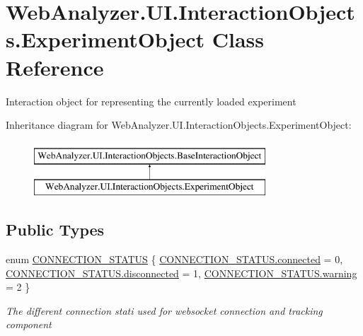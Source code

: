 \hypertarget{class_web_analyzer_1_1_u_i_1_1_interaction_objects_1_1_experiment_object}{}\section{Web\+Analyzer.\+U\+I.\+Interaction\+Objects.\+Experiment\+Object Class Reference}
\label{class_web_analyzer_1_1_u_i_1_1_interaction_objects_1_1_experiment_object}


Interaction object for representing the currently loaded experiment  


Inheritance diagram for Web\+Analyzer.\+U\+I.\+Interaction\+Objects.\+Experiment\+Object\+:\begin{figure}[H]
\begin{center}
\leavevmode
\includegraphics[height=2.000000cm]{class_web_analyzer_1_1_u_i_1_1_interaction_objects_1_1_experiment_object}
\end{center}
\end{figure}
\subsection*{Public Types}
\begin{DoxyCompactItemize}
\item 
enum \hyperlink{class_web_analyzer_1_1_u_i_1_1_interaction_objects_1_1_experiment_object_a2875208b4f4b0ed643593152f4ec025c}{C\+O\+N\+N\+E\+C\+T\+I\+O\+N\+\_\+\+S\+T\+A\+T\+U\+S} \{ \hyperlink{class_web_analyzer_1_1_u_i_1_1_interaction_objects_1_1_experiment_object_a2875208b4f4b0ed643593152f4ec025ca06aa6fa8bdc2078e7e1bd903e70c8f6a}{C\+O\+N\+N\+E\+C\+T\+I\+O\+N\+\_\+\+S\+T\+A\+T\+U\+S.\+connected} = 0, 
\hyperlink{class_web_analyzer_1_1_u_i_1_1_interaction_objects_1_1_experiment_object_a2875208b4f4b0ed643593152f4ec025ca3a561116f0c9675a3c83d21fa365050d}{C\+O\+N\+N\+E\+C\+T\+I\+O\+N\+\_\+\+S\+T\+A\+T\+U\+S.\+disconnected} = 1, 
\hyperlink{class_web_analyzer_1_1_u_i_1_1_interaction_objects_1_1_experiment_object_a2875208b4f4b0ed643593152f4ec025ca7b83d3f08fa392b79e3f553b585971cd}{C\+O\+N\+N\+E\+C\+T\+I\+O\+N\+\_\+\+S\+T\+A\+T\+U\+S.\+warning} = 2
 \}\begin{DoxyCompactList}\small\item\em The different connection stati used for websocket connection and tracking component \end{DoxyCompactList}
\end{DoxyCompactItemize}
